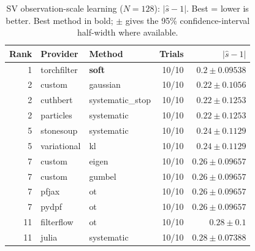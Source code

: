
\begin{table}[!htbp]
\centering
\small
\caption{SV observation-scale learning ($N=128$): $|\hat{s}-1|$. Best = lower is better. Best method in bold; $\pm$ gives the 95\% confidence-interval half-width where available.}
\label{tab:sv-observation-scale-learning-parameter-absolute-error}
\begin{tabular}{rllrr}
\toprule
Rank & Provider & Method & Trials & $|\hat{s}-1|$ \\
\midrule
1 & torchfilter & \textbf{soft} & 10/10 & $\mathbf{0.2 \pm 0.09538}$ \\
2 & custom & gaussian & 10/10 & $0.22 \pm 0.1056$ \\
2 & cuthbert & systematic\_stop & 10/10 & $0.22 \pm 0.1253$ \\
2 & particles & systematic & 10/10 & $0.22 \pm 0.1253$ \\
5 & stonesoup & systematic & 10/10 & $0.24 \pm 0.1129$ \\
5 & variational & kl & 10/10 & $0.24 \pm 0.1129$ \\
7 & custom & eigen & 10/10 & $0.26 \pm 0.09657$ \\
7 & custom & gumbel & 10/10 & $0.26 \pm 0.09657$ \\
7 & pfjax & ot & 10/10 & $0.26 \pm 0.09657$ \\
7 & pydpf & ot & 10/10 & $0.26 \pm 0.09657$ \\
11 & filterflow & ot & 10/10 & $0.28 \pm 0.1$ \\
11 & julia & systematic & 10/10 & $0.28 \pm 0.07388$ \\
\bottomrule
\end{tabular}
\end{table}

